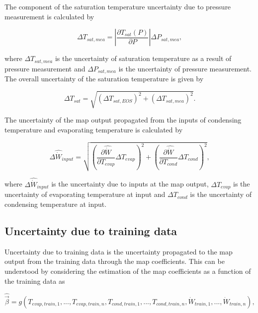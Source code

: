 The component of the saturation temperature uncertainty due to pressure measurement is calculated by

\begin{equation}
\Delta {T_{sat,mea}} = \left|\frac{{\partial {T_{sat}}({P})}}{{\partial {P}}}\right|\Delta {P_{sat,mea}},
\label{eq:uncer_t_mea}
\end{equation}

where $\Delta {T_{sat,mea}}$ is the uncertainty of saturation temperature as a result of pressure measurement and $\Delta P_{sat,mea}$ is the uncertainty of pressure measurement. The overall uncertainty of the saturation temperature is given by 

\begin{equation}
\Delta {T_{sat}} = \sqrt {{{(\Delta {T_{sat,EOS}})}^2} + {{(\Delta {T_{sat,mea}})}^2}} .
\label{eq:uncer_t}
\end{equation}

The uncertainty of the map output propagated from the inputs of condensing temperature and evaporating temperature is calculated by

\begin{equation}
\Delta {\hat{\dot{W}}_{input}} = \sqrt {{\left(\frac{{\partial \hat{\dot{W}}}}{{\partial {T_{evap}}}}\Delta {T_{evap}}\right)^2} + {\left(\frac{{\partial \hat{\dot{W}}}}{{\partial {T_{cond}}}}\Delta {T_{cond}}\right)^2}}, 
\label{eq:uncer_w_input}
\end{equation}

where $\Delta {\hat{\dot{W}}_{input}}$ is the uncertainty due to inputs at the map output, $\Delta {T_{evap}}$ is the uncertainty of evaporating temperature at input and $\Delta T_{cond}$ is the uncertainty of condensing temperature at input.

\subsection{Uncertainty due to training data} \label{subsec:uncer_train}
Uncertainty due to training data is the uncertainty propagated to the map output from the training data through the map coefficients. This can be understood by considering the estimation of the map coefficients as a function of the training data as

\begin{equation}
\hat{ \vec {\beta}}  = g({T_{evap,train,1}},...,{T_{evap,train,n}},{T_{cond,train,1}},...,{T_{cond,train,n}},{\dot{W}_{train,1}},...,{\dot{W}_{train,n}}), 
\label{eq:beta_train}
\end{equation}

